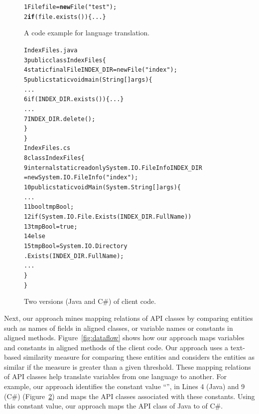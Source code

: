 \begin{figure}[t]
\begin{CodeOut}
\begin{alltt}
1  File file = \textbf{new} File("test");
2    \textbf{if}(file.exists())\{...\}
\end{alltt}
\end{CodeOut}\vspace*{-4ex}
\caption{\label{fig:totranslation} A code example for language
translation.}%
\end{figure}
\begin{figure}[t]
\begin{CodeOut}\vspace*{-2ex}
\begin{alltt}
                  IndexFiles.java
3 public class IndexFiles \{
4   static final File INDEX_DIR = new File("index");
5   public static void main(String[] args) \{
      ...
6     if (INDEX_DIR.exists()) \{...\}
      ...
7       INDEX_DIR.delete();
    \}
  \}
                  IndexFiles.cs
8 class IndexFiles\{
9   internal static readonly System.IO.FileInfo INDEX_DIR
          = new System.IO.FileInfo("index");
10   public static void  Main(System.String[] args)\{
      ...
11     bool tmpBool;
12     if (System.IO.File.Exists(INDEX_DIR.FullName))
13       tmpBool = true;
14    else
15       tmpBool = System.IO.Directory
                         .Exists(INDEX_DIR.FullName);
      ...
    \}
 \}
\end{alltt}
\end{CodeOut}\vspace*{-4ex}
\caption{\label{fig:clientcode} Two versions (Java and C\#) of
client code.}\vspace*{-4ex}
\end{figure}

Next, our approach mines mapping relations of API classes by comparing entities such as
names of fields in aligned classes, or variable names or constants in aligned methods. 
Figure~\ref{fig:dataflow} shows how our approach maps variables and constants in aligned methods 
of the client code. Our approach uses a text-based similarity measure for comparing these entities
and considers the entities as similar if the measure is greater than a given threshold.
These mapping relations of API classes help translate variables from one language to another. 
For example, our approach identifies the constant value ``'',
in Lines 4 (Java) and 9 (C\#) (Figure~\ref{fig:clientcode}) and
maps the API classes associated with these constants. 
Using this constant value, our approach maps the API
class  of Java to  of C\#.  

